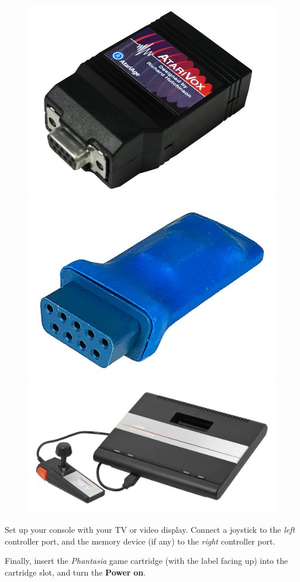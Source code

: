 \documentclass[10pt,twocolumn,openany,article]{memoir}
\begin{document}
\begin{figure}[b]
  \begin{center}
    \includegraphics[width=.6667\columnwidth]{../Manual/AtariVox.jpeg}
    \includegraphics[width=.6667\columnwidth]{../Manual/SaveKey.jpeg}
    \includegraphics[width=.6667\columnwidth]{../Manual/Atari-7800.jpeg}
  \end{center}
\end{figure}

Set up your console with your TV or video display. Connect a joystick to
the \emph{left} controller port, and the memory
device (if any) to the \emph{right} controller port.

Finally, insert  the \textit{Phantasia}  game cartridge (with  the label
facing  up)  into  the  cartridge  slot,  and  turn  the  \textbf{Power}
\textbf{on}.
\end{document}
